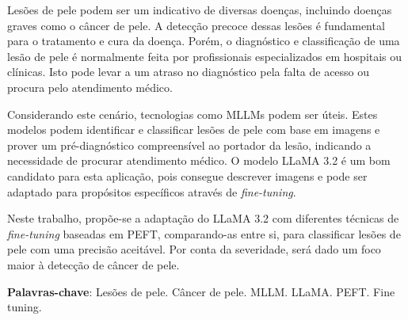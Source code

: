 \imprimircapa

\imprimirfolhaderosto*

% 	

% 

% 


\setlength{\absparsep}{18pt}
\begin{resumo}
	\SingleSpacing
	Lesões de pele podem ser um indicativo de diversas doenças, incluindo doenças graves como o câncer de pele. A detecção precoce dessas lesões é fundamental para o
	tratamento e cura da doença. Porém, o diagnóstico e classificação de uma lesão de pele é normalmente feita por profissionais especializados em hospitais ou clínicas.
	Isto pode levar a um atraso no diagnóstico pela falta de acesso ou procura pelo atendimento médico.

	Considerando este cenário, tecnologias como \acp{MLLM} podem ser úteis. Estes modelos podem identificar e classificar lesões de pele com base em imagens e prover um
	pré-diagnóstico compreensível ao portador da lesão, indicando a necessidade de procurar atendimento médico. O modelo \ac{LLaMA} 3.2 é um bom candidato para esta
	aplicação, pois consegue descrever imagens e pode ser adaptado para propósitos específicos através de \textit{fine-tuning}.

	Neste trabalho, propõe-se a adaptação do \ac{LLaMA} 3.2 com diferentes técnicas de \textit{fine-tuning} baseadas em \ac{PEFT}, comparando-as entre si, para
	classificar lesões de pele com uma precisão aceitável. Por conta da severidade, será dado um foco maior à detecção de câncer de pele.

	\textbf{Palavras-chave}: Lesões de pele. Câncer de pele. MLLM. LLaMA. PEFT. Fine tuning.
\end{resumo}

